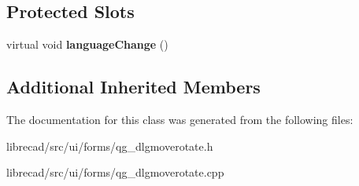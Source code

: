 \subsection*{Protected Slots}
\begin{DoxyCompactItemize}
\item 
\hypertarget{classQG__DlgMoveRotate_ac4d33768b3600ef76fb5fdd125c6009e}{virtual void {\bfseries language\-Change} ()}\label{classQG__DlgMoveRotate_ac4d33768b3600ef76fb5fdd125c6009e}

\end{DoxyCompactItemize}
\subsection*{Additional Inherited Members}


The documentation for this class was generated from the following files\-:\begin{DoxyCompactItemize}
\item 
librecad/src/ui/forms/qg\-\_\-dlgmoverotate.\-h\item 
librecad/src/ui/forms/qg\-\_\-dlgmoverotate.\-cpp\end{DoxyCompactItemize}
